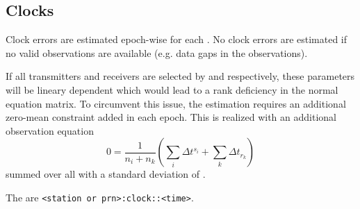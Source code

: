 \subsection{Clocks}\label{gnssParametrizationType:clocks}
Clock errors are estimated epoch-wise for each .
No clock errors are estimated if no valid observations are available (e.g. data gaps in the observations).

If all transmitters and receivers are selected by  and  respectively,
these parameters will be lineary dependent which would lead to a rank deficiency in the normal equation
matrix. To circumvent this issue, the estimation requires an additional zero-mean constraint added in each epoch.
This is realized with an additional observation equation
\begin{equation}
  0 = \frac{1}{n_i + n_k} (\sum_i \Delta t^{s_i} + \sum_k \Delta t_{r_k})
\end{equation}
summed over all 
with a standard deviation of .

The  are \verb|<station or prn>:clock::<time>|.


